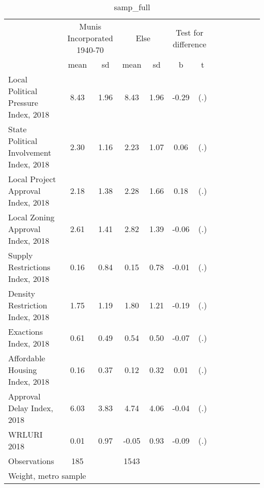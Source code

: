 \begin{table}[htbp]\centering
\def\sym#1{\ifmmode^{#1}\else\(^{#1}\)\fi}
\caption{samp\_full \label{tab1}}
\begin{tabular}{l*{3}{cccc}}
\toprule
                    &\multicolumn{2}{c}{Munis Incorporated 1940-70}&\multicolumn{2}{c}{Else} &\multicolumn{2}{c}{Test for difference}\\
                    &        mean&          sd&        mean&          sd&           b         &           t\\
\midrule
Local Political Pressure Index, 2018&        8.43&        1.96&        8.43&        1.96&       -0.29         &         (.)\\
State Political Involvement Index, 2018&        2.30&        1.16&        2.23&        1.07&        0.06         &         (.)\\
Local Project Approval Index, 2018&        2.18&        1.38&        2.28&        1.66&        0.18         &         (.)\\
Local Zoning Approval Index, 2018&        2.61&        1.41&        2.82&        1.39&       -0.06         &         (.)\\
Supply Restrictions Index, 2018&        0.16&        0.84&        0.15&        0.78&       -0.01         &         (.)\\
Density Restriction Index, 2018&        1.75&        1.19&        1.80&        1.21&       -0.19         &         (.)\\
Exactions Index, 2018&        0.61&        0.49&        0.54&        0.50&       -0.07         &         (.)\\
Affordable Housing Index, 2018&        0.16&        0.37&        0.12&        0.32&        0.01         &         (.)\\
Approval Delay Index, 2018&        6.03&        3.83&        4.74&        4.06&       -0.04         &         (.)\\
WRLURI 2018         &        0.01&        0.97&       -0.05&        0.93&       -0.09         &         (.)\\
\midrule
Observations        &         185&            &        1543&            &                     &            \\
\bottomrule
\multicolumn{7}{l}{\footnotesize Weight, metro sample}\\
\end{tabular}
\end{table}
